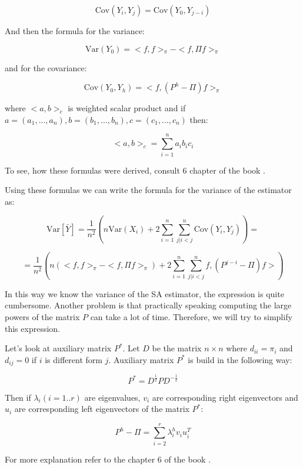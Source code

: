 \documentclass[12pt]{report}
\begin{document}
$$\mathrm{Cov}(Y_i, Y_j) = \mathrm{Cov} (Y_0, Y_{j-i})$$

And then the formula for the variance:

$$\mathrm{Var}(Y_0) = <f, f>_{\pi} - <f, \Pi f>_{\pi}$$

and for the covariance:

$$\mathrm{Cov}(Y_0, Y_h) = <f, (P^h - \Pi)f>_{\pi}$$

where $<a,b>_c$ is weighted scalar product and if $a = (a_1, ..., a_n), b = (b_1, ..., b_n), c = (c_1, ..., c_n)$ then:

$$<a,b>_c = \sum_{i = 1}^n a_i b_i c_i$$

To see, how these formulas were derived, consult 6 chapter of the book \cite{bremaud2013markov}.



Using these formulas we can write the formula for the variance of the estimator as:

$$ \mathrm{Var}\left[\bar{Y} \right] = \frac{1}{n^2} \left( n\mathrm{Var}(X_i) + 2\sum_{i=1}^n \sum_{j|i < j}^n \mathrm{Cov}(Y_i, Y_j)\right) = $$

\begin{equation}\label{eq:varGen}
 = \frac{1}{n^2} \left( n(<f, f>_{\pi} - <f, \Pi f>_{\pi}) + 2\sum_{i=1}^n \sum_{j|i < j}^n  f, (P^{j-i} - \Pi)f> \right)
\end{equation}

In this way we know the variance of the SA estimator, the expression is quite cumbersome. Another problem is that practically speaking computing the large powers of the matrix $P$ can take a lot of time. Therefore, we will try to simplify this expression. 

Let's look at auxiliary matrix $P^*$. Let $D$ be the matrix $n \times n$ where $d_{ii} = \pi_i$ and $d_{ij} = 0$ if $i$ is different form $j$. Auxiliary matrix $P^*$ is build in the following way:

$$P^* = D^{\frac{1}{2}} P D^{-\frac{1}{2}}$$


Then if $\lambda_i (i=1..r)$ are eigenvalues, $v_i$ are corresponding right eigenvectors and $u_i$ are corresponding left eigenvectors of the matrix $P^*$:

\begin{equation}\label{eq:varGen2}
P^h - \Pi = \sum_{i = 2}^r \lambda_i^h v_i u_i^T
\end{equation}

For more explanation refer to the chapter 6 of the book \cite{bremaud2013markov}.
\end{document}
